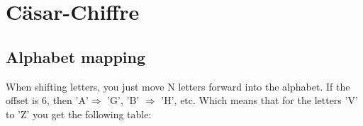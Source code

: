 \begin{comment}
\section{Modulare Arithmetik II}
\label{section:mod_arithmetik2}

\subsection[1/9 mod 17 = 9\textsuperscript{-1} mod 17]{$\frac{1}{9} \mod 17 = 9^{-1} \mod 17$}
\label{section:3a}
\begin{equation}
	\begin{split}
		\frac{1}{9} \mod 17 = 9^{-1} \mod 17 
	\end{split}
\end{equation}

\subsection[2/8 mod 23 = 2 * 8\textsuperscript{-1} mod 23]{$\frac{2}{8} \mod 23 = 2 \times 8^{-1} \mod 23$}
\label{section:3b}
\begin{equation}
	\begin{split}
		\frac{2}{8} \mod 23 = 2 \times 8^{-1} \mod 23
	\end{split}
\end{equation}

\subsection[4/7 mod 13 = 4 * 7\textsuperscript{-1} mod 13]{$\frac{4}{7} \mod 13 = 9^{-1} \mod 13$}
\label{section:3c}
\begin{equation}
	\begin{split}
		\frac{4}{7} \mod 13 = 9^{-1} \mod 13
	\end{split}
\end{equation}

\end{comment}

\section{Cäsar-Chiffre}
\label{section:caesar_cipher}

\subsection{Alphabet mapping}
\label{section:4a}
When shifting letters, you just move N letters forward into the alphabet. 
If the offset is 6, then 'A'$\Rightarrow$ 'G', 'B' $\Rightarrow$ 'H', etc.
Which means that for the letters 'V' to 'Z' you get the following table:

